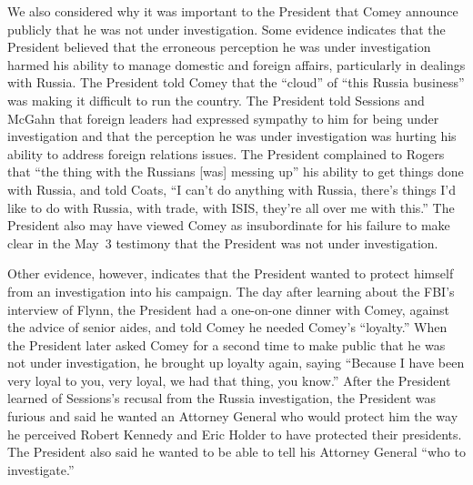 We also considered why it was important to the President that Comey announce publicly that he was not under investigation.
Some evidence indicates that the President believed that the erroneous perception he was under investigation harmed his ability to manage domestic and foreign affairs, particularly in dealings with Russia.
The President told Comey that the ``cloud'' of ``this Russia business'' was making it difficult to run the country.
The President told Sessions and McGahn that foreign leaders had expressed sympathy to him for being under investigation and that the perception he was under investigation was hurting his ability to address foreign relations issues.
The President complained to Rogers that ``the thing with the Russians [was] messing up'' his ability to get things done with Russia, and told Coats, ``I can't do anything with Russia, there's things I'd
like to do with Russia, with trade, with ISIS, they're all over me with this.''
The President also may have viewed Comey as insubordinate for his failure to make clear in the May~3 testimony that the President was not under investigation.

Other evidence, however, indicates that the President wanted to protect himself from an investigation into his campaign.
The day after learning about the FBI's interview of Flynn, the President had a one-on-one dinner with Comey, against the advice of senior aides, and told Comey he needed Comey's ``loyalty.''
When the President later asked Comey for a second time to make public that he was not under investigation, he brought up loyalty again, saying ``Because I have been very loyal to you, very loyal, we had that thing, you know.''
After the President learned of Sessions's recusal from the Russia investigation, the President was furious and said he wanted an Attorney General who would protect him the way he perceived Robert Kennedy and Eric Holder to have protected their presidents.
The President also said he wanted to be able to tell his Attorney General ``who to investigate.''

